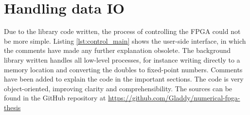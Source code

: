 \chapter{Handling data IO}
\label{app:data_io}
Due to the library code written, the process of controlling the FPGA could not be more simple. Listing \ref{lst:control_main} shows the user-side interface, in which the comments have made any further explanation obsolete. The background library written handles all low-level processes, for instance writing directly to a memory location and converting the doubles to fixed-point numbers. Comments have been added to explain the code in the important sections. The code is very object-oriented, improving clarity and comprehensibility. The sources can be found in the GitHub repository at \url{https://github.com/Gladdy/numerical-fpga-thesis}  



